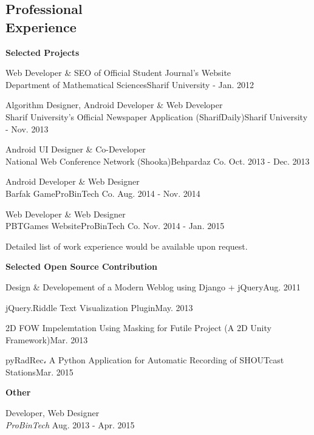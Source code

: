 \documentclass[margin,line]{resume}
\begin{document}
\begin{resume}
    \section{\mysidestyle Professional\\Experience}
    {\bf Selected Projects}
    \begin{list2}
        \vspace*{1mm}
        \item Web Developer \& SEO of Official Student Journal's Website \\
        Department of Mathematical Sciences\hfill{\sf Sharif University - Jan. 2012}
        \item Algorithm Designer, Android Developer \& Web Developer\\
        Sharif University's Official Newspaper Application (SharifDaily)\hfill{\sf Sharif University - Nov. 2013}
        \item Android UI Designer \& Co-Developer\\
        National Web Conference Network (Shooka)\hfill{\sf Behpardaz Co. Oct. 2013 - Dec. 2013}
        \item Android Developer \& Web Designer\\
        Barfak Game\hfill{\sf ProBinTech Co. Aug. 2014 - Nov. 2014}
        \item Web Developer \& Web Designer\\
        PBTGames Website\hfill{\sf ProBinTech Co. Nov. 2014 - Jan. 2015}
    \end{list2}
    Detailed list of work experience would be available upon request.
    
    {\bf Selected Open Source Contribution}
	\begin{list2}
        \vspace*{1mm}
        \item Design \& Developement  of a Modern Weblog using Django + jQuery\hfill{\sf Aug. 2011}
         \item jQuery.Riddle Text Visualization Plugin\hfill{\sf May. 2013}
        \item 2D FOW Impelemtation Using Masking for Futile Project (A 2D Unity Framework)\hfill{\sf Mar. 2013}
        \item pyRadRec، A Python Application for Automatic Recording of SHOUTcast Stations\hfill{\sf Mar. 2015}
     \end{list2}
     {\bf Other}
     \begin{list2}
        \vspace*{1mm}
        \item Developer, Web Designer\\
       {\sl ProBinTech}  \hfill{\sf Aug. 2013 - Apr. 2015}
     \end{list2}
        

\end{resume}
\end{document}
